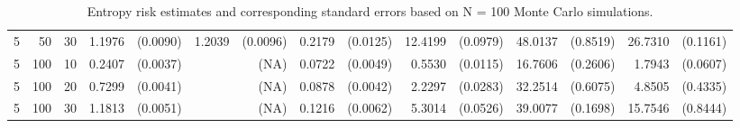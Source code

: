 \begin{table}[ht]
\begin{small}
\begin{tabular}{lrrrrrrrrrrrrrr}
  5 & 50 & 30 & 1.1976 & (0.0090) & 1.2039 & (0.0096) & 0.2179 & (0.0125) & 12.4199 & (0.0979) & 48.0137 & (0.8519) & 26.7310 & (0.1161) \\ 
  5 & 100 & 10 & 0.2407 & (0.0037) &  & (NA) & 0.0722 & (0.0049) & 0.5530 & (0.0115) & 16.7606 & (0.2606) & 1.7943 & (0.0607) \\ 
  5 & 100 & 20 & 0.7299 & (0.0041) &  & (NA) & 0.0878 & (0.0042) & 2.2297 & (0.0283) & 32.2514 & (0.6075) & 4.8505 & (0.4335) \\ 
  5 & 100 & 30 & 1.1813 & (0.0051) &  & (NA) & 0.1216 & (0.0062) & 5.3014 & (0.0526) & 39.0077 & (0.1698) & 15.7546 & (0.8444) \\ 
   \hline
\end{tabular}
\end{small}
\caption{Entropy risk estimates and corresponding standard errors based on N = 100 Monte Carlo simulations.} 
\end{table}
